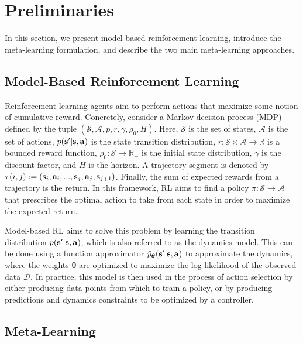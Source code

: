 \vspsec
\section{Preliminaries} \label{sec:prelim}
\vspsec
In this section, we present model-based reinforcement learning, introduce the meta-learning formulation, and describe the two main meta-learning approaches.
\vspsubsec
\subsection{Model-Based Reinforcement Learning} \label{sec:prelim-mb}
\vspsubsec
Reinforcement learning agents aim to perform actions that maximize some notion of cumulative reward. Concretely, consider a Markov decision process (MDP)
defined by the tuple $(\mathcal{S}, \mathcal{A}, p, r, \gamma, \rho_0, H)$. Here, $\mathcal{S}$ is the set of states, $\mathcal{A}$ is the set of actions, $p({\bf s'}|{\bf s}, {\bf a})$ is the state transition distribution, $r: \mathcal{S} \times \mathcal{A} \rightarrow \mathbb{R}$ is a bounded reward function, $\rho_0: \mathcal{S} \to \mathbb{R}_+$ is the initial state distribution, $\gamma$ is the discount factor, and $H$ is the horizon. A trajectory segment is denoted by  $\tau(i, j) := ({\bf s}_{i}, {\bf a}_{i}, ..., {\bf s}_{j}, {\bf a}_{j}, {\bf s}_{j+1})$. Finally, the sum of expected rewards from a trajectory is the return. In this framework, RL aims to find a policy $\pi: \mathcal{S} \rightarrow \mathcal{A}$ that prescribes the optimal action to take from each state in order to maximize the expected return. 

Model-based RL aims to solve this problem by learning the transition distribution $p({\bf s'}|{\bf s}, {\bf a})$, which is also referred to as the dynamics model. This can be done using a function approximator $\hat p_{\bm{\theta}}({\bf s'}|{\bf s}, {\bf a})$ to approximate the dynamics, where the weights $\bm{\theta}$ are optimized to maximize the log-likelihood of the observed data $\mathcal{D}$. In practice, this model is then used in the process of action selection by either producing data points from which to train a policy, or by producing predictions and dynamics constraints to be optimized by a controller.

\vspsubsec
\subsection{Meta-Learning} \label{sec:prelim-meta}
\vspsubsec

